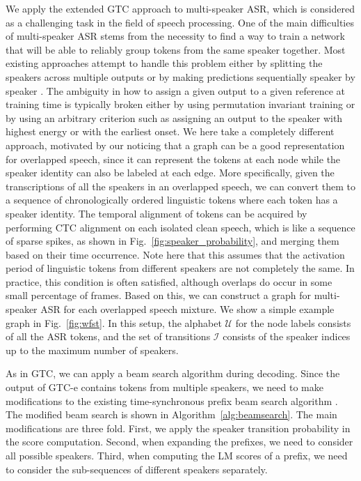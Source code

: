 \documentclass{article}
\begin{document}
We apply the extended GTC approach to multi-speaker ASR, which is considered as a challenging task in the field of speech processing. One of the main difficulties of multi-speaker ASR stems from the necessity
to find a way to train a network that will be able to reliably group tokens from the same speaker together. Most existing approaches attempt to handle
this problem either by splitting the speakers across multiple outputs \cite{yu2017permutation,chang2019end} or by making predictions sequentially speaker by speaker \cite{kanda2020serialized,shi2020sequence,guo2021multi}. The ambiguity in how to assign a given output to a given reference at training time is typically broken either by using permutation invariant training or by using an arbitrary criterion such as assigning an output to the speaker with highest energy or with the earliest onset. We here take a completely different approach, motivated by our noticing that a graph can be a good representation for overlapped speech, since it can represent the tokens at each node while the speaker identity can also be labeled at each edge. More specifically, given the transcriptions of all the speakers in an overlapped speech, we can convert them to a sequence of
chronologically ordered linguistic tokens where each token has a speaker identity. The temporal alignment of tokens can be acquired by performing CTC alignment on each isolated clean speech, which is like a sequence of sparse spikes, as shown in Fig.~\ref{fig:speaker_probability}, and merging them based on their time occurrence. Note here that this assumes that the activation period of linguistic tokens from different speakers are not completely the same. In practice, this condition is often satisfied, although overlaps do occur in some small percentage of frames. Based on this, we can construct a graph for multi-speaker ASR for each overlapped speech mixture. We show a simple example graph in Fig.~\ref{fig:wfst}.
In this setup, the alphabet $\mathcal{U}$ for the node labels consists of all the ASR tokens, and the set of transitions $\mathcal{I}$ consists of the speaker indices up to the maximum number of speakers.

As in GTC\cite{moritz2021semi}, we can apply a beam search algorithm during decoding. Since the output of GTC-e contains tokens from multiple speakers, we need to make modifications to the existing time-synchronous prefix beam search algorithm \cite{hannun2014first,moritz2019streaming}. The modified beam search is shown in Algorithm~\ref{alg:beamsearch}. The main modifications are three fold. First, we apply the speaker transition probability in the score computation. Second, when expanding the prefixes, we need to consider all possible speakers. Third, when computing the LM scores of a prefix, we need to consider the sub-sequences of different speakers separately. 

\end{document}
